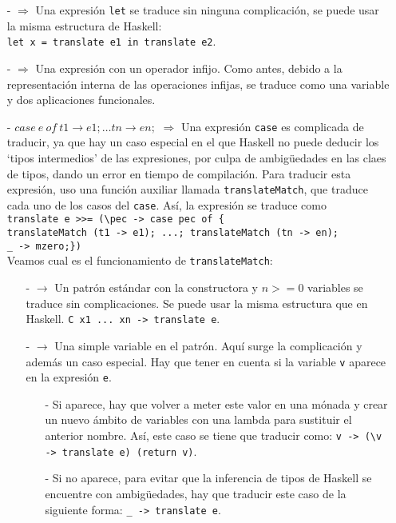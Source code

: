 \documentclass[class=article, crop=false]{standalone}
\begin{document}
\begin{itemize}
  \item[-]{} $\Rightarrow$ Una expresión
  \verb`let` se traduce sin ninguna complicación, se puede usar la misma estructura de
  Haskell: \\
  \verb`let x = translate e1 in translate e2`.

  \item[-]{} $\Rightarrow$ Una expresión con un
  operador infijo. Como antes, debido a la representación interna de las operaciones infijas,
  se traduce como una variable y dos aplicaciones funcionales.

  \item[-]$case \: e \: of \: t1 \rightarrow e1 ; \ldots tn \rightarrow en ;$ $\Rightarrow$
  Una expresión \verb`case` es complicada de traducir, ya que hay un caso especial en el que
  Haskell no puede deducir los `tipos intermedios' de las expresiones, por culpa de
  ambigüedades en las claes de tipos, dando un error en tiempo de compilación. Para traducir
  esta expresión, uso una función auxiliar llamada \verb`translateMatch`, que traduce cada
  uno de los casos del \verb`case`. Así, la expresión se traduce como \\
  \verb`translate e >>= (\pec -> case pec of {`\\
  \verb`translateMatch (t1 -> e1); ...; translateMatch (tn -> en);`\\
  \verb`_ -> mzero;})` \\
  Veamos cual es el funcionamiento de \verb`translateMatch`:
  \begin{itemize}
    \item[-]{}
    $\rightarrow$ Un patrón estándar con la constructora y $n>=0$ variables se traduce sin
    complicaciones. Se puede usar la misma estructura que en Haskell.
    \verb`C x1 ... xn -> translate e`.

    \item[-] $\rightarrow$ Una simple variable
    en el patrón. Aquí surge la complicación y además un caso especial. Hay que tener en
    cuenta si la variable \verb`v` aparece en la expresión \verb`e`.
    \begin{itemize}
      \item[-] Si aparece, hay que volver a meter este valor en una mónada y crear un nuevo
      ámbito de variables con una lambda para sustituir el anterior nombre. Así, este caso
      se tiene que traducir como: \verb`v -> (\v -> translate e) (return v)`.
      \item[-] Si no aparece, para evitar que la inferencia de tipos de Haskell se encuentre
      con ambigüedades, hay que traducir este caso de la siguiente forma:
      \verb`_ -> translate e`.
    \end{itemize}
  \end{itemize}
\end{itemize}
\end{document}
